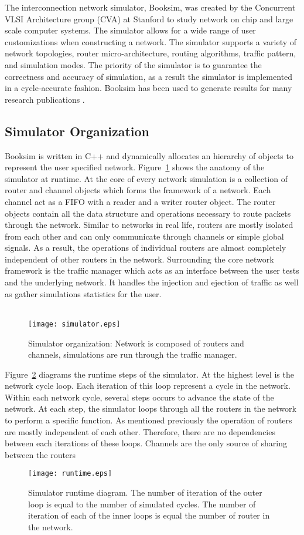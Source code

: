 
The interconnection network simulator, Booksim, was created by the Concurrent VLSI Architecture group (CVA) at Stanford to study network on chip and large scale computer systems. The simulator allows for a wide range of user customizations when constructing a network. The simulator supports a variety of network topologies, router micro-architecture, routing algorithms, traffic pattern, and simulation modes. The priority of the simulator is  to guarantee the correctness and accuracy of simulation, as a result the simulator is implemented in a cycle-accurate fashion. Booksim has been used to generate results for many research publications \cite{cdragon,KimISCA07,PPIN}. 
\subsection{Simulator Organization}
Booksim is written in C++ and dynamically allocates an hierarchy of objects to represent the user specified network. Figure~\ref{fig:simulator} shows the anatomy of the simulator at runtime. At the core of every network simulation is a collection of router and channel objects which forms the framework of a network. Each channel act as a FIFO with a reader and a writer router object. The router objects contain all the data structure and operations necessary to route packets through the network. Similar to networks in real life, routers are mostly isolated from each other and can only communicate through channels or simple global signals. As a result, the operations of individual routers are almost completely independent of other routers in the network. Surrounding the core network framework is the traffic manager which acts as an interface between the user tests and the underlying network. It handles the injection and ejection of traffic as well as gather simulations statistics for the user. \\
~\\
\begin{figure}[h]
\centering
\texttt{[image: simulator.eps]}
\caption{Simulator organization: Network is composed of routers and channels, simulations are run through the traffic manager. }
\label{fig:simulator}
\end{figure}
Figure~\ref{fig:runtime} diagrams the runtime steps of the simulator. At the highest level is the network cycle loop. Each iteration of this loop represent a cycle in the network. Within each network cycle, several steps occurs to advance the state of the network. At each step, the simulator loops through all the routers in the network to perform a specific function. As mentioned previously the operation of routers are mostly independent of each other. Therefore, there are no dependencies between each iterations of these loops. Channels are the only source of sharing between the routers 
\begin{figure}[h]
\centering
\texttt{[image: runtime.eps]}
\caption{Simulator runtime diagram. The number of iteration of the outer loop is equal to the number of simulated cycles. The number of iteration of each of the inner loops is equal the number of router in the network.}
\label{fig:runtime}
\end{figure}
